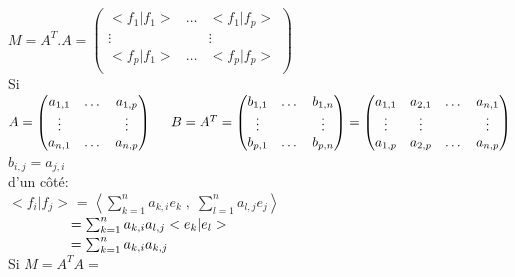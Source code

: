 \documentclass{article}
\newcommand\tab[1][1cm]{\hspace*{#1}}
\begin{document}
$M = A^T . A = \begin{pmatrix}
    <f_1 | f_1> & \dots & <f_1 | f_p>\\
    \vdots & & \vdots\\
    <f_p | f_1> & \dots & <f_p | f_p>\\
\end{pmatrix}$\\
Si $A = \begin{pmatrix}
    a_{1,1} & \dots & a_{1,p}\\
    \vdots & & \vdots\\
    a_{n,1} & \dots & a_{n,p}\\ 
\end{pmatrix} \tab[0.5cm] B = A^T = \begin{pmatrix}
    b_{1,1} & \dots & b_{1,n}\\
    \vdots & & \vdots\\
    b_{p,1} & \dots & b_{p,n}\\ 
\end{pmatrix} = \begin{pmatrix}
    a_{1,1} & a_{2, 1} & \dots & a_{n,1}\\
    \vdots & \vdots & & \vdots\\
    a_{1,p} & a_{2, p} & \dots & a_{n,p}\\ 
\end{pmatrix}$
$b_{i,j} = a_{j,i}$\\
d'un côté:\\
$<f_i | f_j>$ = $\left<\sum_{k = 1}^n a_{k, i} e_k \; , \; \sum_{l = 1}^n a_{l, j} e_j
\right>$\\
$\tab[1.56cm] = \sum_{k=1}^n a_{k, i} a_{l, j} <e_k | e_l>$\\
$\tab[1.56cm] = \sum_{k=1}^n a_{k, i} a_{k, j}$\\
Si $M = A^T A =$
\end{document}
